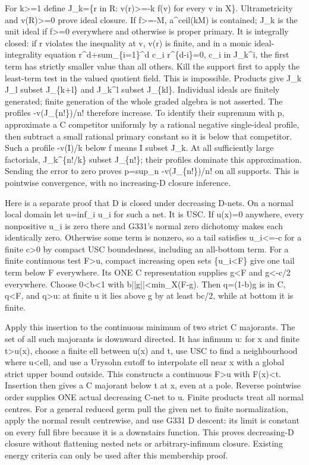 \documentclass[11pt]{article}
\begin{document}
For k>=1 define J\_k=\{r in R: v(r)>=-k f(v) for every v in X\}. Ultrametricity and v(R)>=0 prove ideal closure. If f>=-M, a\textasciicircum{}ceil(kM) is contained; J\_k is the unit ideal if f>=0 everywhere and otherwise is proper primary. It is integrally closed: if r violates the inequality at v, v(r) is finite, and in a monic ideal-integrality equation r\textasciicircum{}d+sum\_\{i=1\}\textasciicircum{}d c\_i r\textasciicircum{}\{d-i\}=0, c\_i in J\_k\textasciicircum{}i, the first term has strictly smaller value than all others. Kill the support first to apply the least-term test in the valued quotient field. This is impossible. Products give J\_k J\_l subset J\_\{k+l\} and J\_k\textasciicircum{}l subset J\_\{kl\}. Individual ideals are finitely generated; finite generation of the whole graded algebra is not asserted. The profiles -v(J\_\{n!\})/n! therefore increase. To identify their supremum with p, approximate a C competitor uniformly by a rational negative single-ideal profile, then subtract a small rational primary constant so it is below that competitor. Such a profile -v(I)/k below f means I subset J\_k. At all sufficiently large factorials, J\_k\textasciicircum{}\{n!/k\} subset J\_\{n!\}; their profiles dominate this approximation. Sending the error to zero proves p=sup\_n -v(J\_\{n!\})/n! on all supports. This is pointwise convergence, with no increasing-D closure inference.

Here is a separate proof that D is closed under decreasing D-nets. On a normal local domain let u=inf\_i u\_i for such a net. It is USC. If u(x)=0 anywhere, every nonpositive u\_i is zero there and G331's normal zero dichotomy makes each identically zero. Otherwise some term is nonzero, so a tail satisfies u\_i<=-c for a finite c>0 by compact USC boundedness, including an all-bottom term. For a finite continuous test F>u, compact increasing open sets \{u\_i<F\} give one tail term below F everywhere. Its ONE C representation supplies g<F and g<-c/2 everywhere. Choose 0<b<1 with b||g||<min\_X(F-g). Then q=(1-b)g is in C, q<F, and q>u: at finite u it lies above g by at least bc/2, while at bottom it is finite.

Apply this insertion to the continuous minimum of two strict C majorants. The set of all such majorants is downward directed. It has infimum u: for x and finite t>u(x), choose a finite ell between u(x) and t, use USC to find a neighbourhood where u<ell, and use a Urysohn cutoff to interpolate ell near x with a global strict upper bound outside. This constructs a continuous F>u with F(x)<t. Insertion then gives a C majorant below t at x, even at a pole. Reverse pointwise order supplies ONE actual decreasing C-net to u. Finite products treat all normal centres. For a general reduced germ pull the given net to finite normalization, apply the normal result centrewise, and use G331 D descent: its limit is constant on every full fibre because it is a downstairs function. This proves decreasing-D closure without flattening nested nets or arbitrary-infimum closure. Existing energy criteria can only be used after this membership proof.
\end{document}
